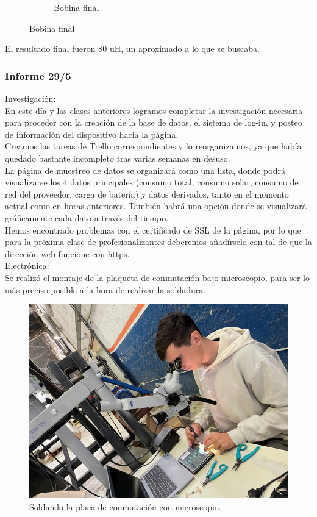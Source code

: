 \begin{figure}[H]
\begin{subfigure}{0.5\textwidth}
\caption{Bobina final}
\end{subfigure}

\end{figure}

El resultado final fueron 80 uH, un aproximado a lo que se buscaba.\\

\subsubsection{Informe 29/5}

Investigación:\\

En este día y las clases anteriores logramos completar la investigación necesaria para proceder con la creación de la base de datos, el sistema de log-in, y posteo de información del dispositivo hacia la página.\\

Creamos las tareas de Trello correspondientes y lo reorganizamos, ya que había quedado bastante incompleto tras varias semanas en desuso.\\

La página de muestreo de datos se organizará como una lista, donde podrá visualizarse los 4 datos principales (consumo total, consumo solar, consumo de red del proveedor, carga de batería) y datos derivados, tanto en el momento actual como en horas anteriores. También habrá una opción donde se visualizará gráficamente cada dato a través del tiempo.\\

Hemos encontrado problemas con el certificado de SSL de la página, por lo que para la próxima clase de profesionalizantes deberemos añadírselo con tal de que la dirección web funcione con https.\\

Electrónica:\\

Se realizó el montaje de la plaqueta de conmutación bajo microscopio, para ser lo más preciso posible a la hora de realizar la soldadura.\\

\begin{figure}[H]
    \centering
    \includegraphics[width=0.75\linewidth]{informes/IMG_8196.jpg}
    \caption{Soldando la placa de conmutación con microscopio.}
\end{figure}

